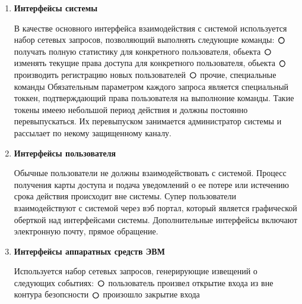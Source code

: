 \documentclass[12pt]{article} %
\def\circmark{\mathbin{\scalerel*{\circ}{j}}}
\begin{document}
\begin{enumerate}
\begin{enumerate}
  			\begin{enumerate}
  				\item \begin{large} \textbf{Интерфейсы системы} \end{large} \newline
            В качестве основного интерфейса взаимодействия с системой используется набор сетевых запросов, позволяющий выполнять следующие команды: \newline
            $\circmark $ получать полную статистику для конкретного пользователя, обьекта \newline
            $\circmark $ изменять текущие права доступа для конкретного пользователя, обьекта \newline
            $\circmark $ производить регистрацию новых пользователей \newline
            $\circmark $ прочие, специальные команды \newline
            Обязательным параметром каждого запроса является специальный токкен, подтверждающий права пользователя на выполноние команды. Такие токены имеею небольшой период действия и должны постоянно перевыпускаться. Их перевыпуском занимается администратор системы и рассылает по некому защищенному каналу.
  				\item \begin{large} \textbf{Интерфейсы пользователя} \end{large} \newline
            Обычные пользователи не должны взаимодействовать с системой. Процесс получения карты доступа и подача уведомлений о ее потере или истечению срока действия происходит вне системы. \newline
            Супер пользователи взаимодействуют с системой через вэб портал, который является графической оберткой над интерфейсами системы. Дополнительные интерфейсы включают электронную почту, прямое обращение. 
          \item \begin{large} \textbf{Интерфейсы аппаратных средств ЭВМ} \end{large} \newline
          Используется набор сетевых запросов, генерирующие извещений о следующих событиях: \newline
            $\circmark $ пользователь произвел открытие входа из вне контура безопсности   \newline
            $\circmark $ произошло закрытие входа \newline

\end{enumerate}
\end{enumerate}
\end{enumerate}
\end{document}

